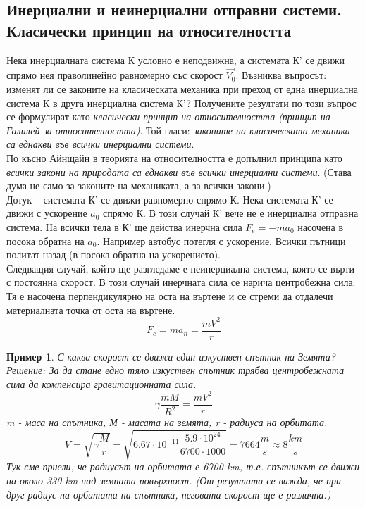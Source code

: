 \documentclass[fleqn, 12pt]{article}
\newtheorem{example}{Пример}[subsection]
\begin{document}
\subsection{Инерциални и неинерциални отправни системи. Класически принцип на относителността}
Нека инерциалната система К условно е неподвижна, а системата К' се движи спрямо нея праволинейно равномерно със скорост $\vec{V_0}$. Възниква въпросът: изменят ли се законите на класическата механика при преход от една инерциална система К в друга инерциална система К'? Получените резултати по този въпрос се формулират като \textit{класически принцип на относителността (принцип на Галилей за относителността)}. Той гласи: \textit{законите на класическата механика са еднакви във всички инерциални системи}. \\
По късно Айнщайн в теорията на относителността е допълнил принципа като \textit{всички закони на природата са еднакви във всички инерциални системи}. (Става дума не само за законите на механиката, а за всички закони.)\\
Дотук – системата К' се движи равномерно спрямо К. Нека системата К' се движи с ускорение $a_0$ спрямо К. В този случай К' вече не е инерциална отправна система. На всички тела в К' ще действа инерчна сила $F_e = -m a_0 $ насочена в посока обратна на $a_0$. Например автобус потегля с ускорение. Всички пътници политат назад (в посока обратна на ускорението). \\
Следващия случай, който ще разгледаме е неинерциална система, която се върти с постоянна скорост. В този случай инерчната сила се нарича центробежна сила. Тя е насочена перпендикулярно на оста на въртене и се стреми да отдалечи материалната точка от оста на въртене.
$$F_c = m a_n = \dfrac{mV^2}{r}$$

\begin{example}
С каква скорост се движи един изкуствен спътник на Земята?\\
Решение:  За да стане едно тяло изкуствен спътник трябва центробежната сила да компенсира
гравитационната сила.
$$\gamma \dfrac{mM}{R^2} = \dfrac{mV^2}{r}$$
m - маса на спътника, М - масата на земята, r - радиуса на орбитата. 
$$V = \sqrt{\gamma \dfrac{M}{r}} = \sqrt{6.67 \cdot 10^{-11} \dfrac{5.9 \cdot 10^{24}}{6700 \cdot 1000}} = 7664 \dfrac{m}{s} \approx 8 \dfrac{km}{s}$$
Тук сме приели, че радиусът на орбитата е 6700 km, т.е. спътникът се движи на около 330 km над земната повърхност. (От резултата се вижда, че при друг радиус на орбитата на спътника, неговата скорост ще е различна.)
\end{example}
\end{document}
